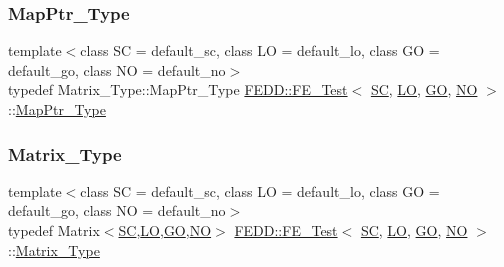 \mbox{\label{classFEDD_1_1FE__Test_af41d3f3475a5ac2e0c7d3aab1b06102b}} 
\subsubsection{\texorpdfstring{Map\+Ptr\+\_\+\+Type}{MapPtr\_Type}}
{\footnotesize\ttfamily template$<$class SC  = default\+\_\+sc, class LO  = default\+\_\+lo, class GO  = default\+\_\+go, class NO  = default\+\_\+no$>$ \\
typedef Matrix\+\_\+\+Type\+::\+Map\+Ptr\+\_\+\+Type \hyperlink{classFEDD_1_1FE__Test}{F\+E\+D\+D\+::\+F\+E\+\_\+\+Test}$<$ \hyperlink{fe__test__laplace_8cpp_a79c7e86a57edbb2a5a53242bcd04e41e}{SC}, \hyperlink{fe__test__laplace_8cpp_ad6a38c9f07d3fd633eefca5bccad8410}{LO}, \hyperlink{fe__test__laplace_8cpp_afa2946b509009b4f45eb04bd8c5b27d9}{GO}, \hyperlink{fe__test__laplace_8cpp_a5e24f37b28787429872b6ecb1d0417ce}{NO} $>$\+::\hyperlink{classFEDD_1_1FE__Test_af41d3f3475a5ac2e0c7d3aab1b06102b}{Map\+Ptr\+\_\+\+Type}}

\mbox{\label{classFEDD_1_1FE__Test_ab21a3d554ec8bf6763a7dabcbe800b35}} 
\subsubsection{\texorpdfstring{Matrix\+\_\+\+Type}{Matrix\_Type}}
{\footnotesize\ttfamily template$<$class SC  = default\+\_\+sc, class LO  = default\+\_\+lo, class GO  = default\+\_\+go, class NO  = default\+\_\+no$>$ \\
typedef Matrix$<$\hyperlink{fe__test__laplace_8cpp_a79c7e86a57edbb2a5a53242bcd04e41e}{SC},\hyperlink{fe__test__laplace_8cpp_ad6a38c9f07d3fd633eefca5bccad8410}{LO},\hyperlink{fe__test__laplace_8cpp_afa2946b509009b4f45eb04bd8c5b27d9}{GO},\hyperlink{fe__test__laplace_8cpp_a5e24f37b28787429872b6ecb1d0417ce}{NO}$>$ \hyperlink{classFEDD_1_1FE__Test}{F\+E\+D\+D\+::\+F\+E\+\_\+\+Test}$<$ \hyperlink{fe__test__laplace_8cpp_a79c7e86a57edbb2a5a53242bcd04e41e}{SC}, \hyperlink{fe__test__laplace_8cpp_ad6a38c9f07d3fd633eefca5bccad8410}{LO}, \hyperlink{fe__test__laplace_8cpp_afa2946b509009b4f45eb04bd8c5b27d9}{GO}, \hyperlink{fe__test__laplace_8cpp_a5e24f37b28787429872b6ecb1d0417ce}{NO} $>$\+::\hyperlink{classFEDD_1_1FE__Test_ab21a3d554ec8bf6763a7dabcbe800b35}{Matrix\+\_\+\+Type}}

